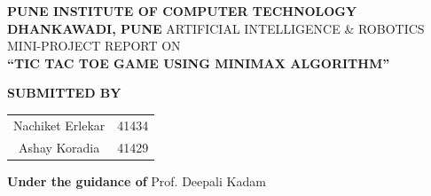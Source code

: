 \documentclass[a4paper, 12pt]{article}
\begin{document}
 
\begin{titlepage}
    \begin{center}
        \vspace*{1cm}
        
        \large
                \textbf{\MakeUppercase{Pune Institute of Computer Technology}}
                \linebreak
        \textbf{\MakeUppercase{Dhankawadi, Pune}}
        \vspace{0.5cm}
                        \linebreak
                        \linebreak
        \MakeUppercase{Artificial Intelligence & Robotics Mini-Project REPORT }
        \linebreak
        ON
        \linebreak
        \vspace{0.5cm}
        \large
        \\
        \textbf{\MakeUppercase{“Tic Tac Toe game using MiniMax Algorithm”}}
        \linebreak
        
        \textbf{SUBMITTED BY}
        \vspace{1cm}
        
        \begin{center}
        \begin{tabular}{ c c }
         Nachiket Erlekar & 41434 \\ 
         Ashay Koradia & 41429
        \end{tabular}
        \end{center}
                
        \textbf{\large{Under the guidance of}}
        \linebreak
        Prof. Deepali Kadam
        \linebreak
        
        
        
        \vspace{0.8cm}
        


\end{center}
\end{titlepage}
\end{document}

